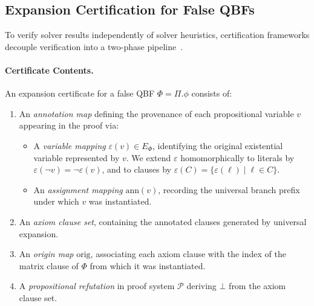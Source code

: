 \documentclass[runningheads]{llncs}
\begin{document}
\subsection{Expansion Certification for False QBFs}
\label{subsec:false-cert}

To verify solver results independently of solver heuristics, certification frameworks decouple verification into a two-phase pipeline~\cite{ferpmodels, ferat}.

\paragraph*{Certificate Contents.}
An expansion certificate for a false QBF $\Phi = \Pi.\phi$ consists of:
\begin{enumerate}
    \item An \emph{annotation map} defining the provenance of each propositional variable $v$ appearing in the proof via:
          \begin{itemize}
              \item A \emph{variable mapping} $\varepsilon(v) \in E_\Phi$, identifying the original existential variable represented by $v$. We extend $\varepsilon$ homomorphically to literals by $\varepsilon(\neg v) = \neg \varepsilon(v)$, and to clauses by $\varepsilon(C) = \{\varepsilon(\ell) \mid \ell \in C\}$.
              \item An \emph{assignment mapping} $\mathrm{ann}(v)$, recording the universal branch prefix under which $v$ was instantiated.
          \end{itemize}
    \item An \emph{axiom clause set}, containing the annotated clauses generated by universal expansion.
    \item An \emph{origin map} $\mathrm{orig}$, associating each axiom clause with the index of the matrix clause of $\Phi$ from which it was instantiated.
    \item A \emph{propositional refutation} in proof system $\mathcal{P}$ deriving $\bot$ from the axiom clause set.
\end{enumerate}
\end{document}
